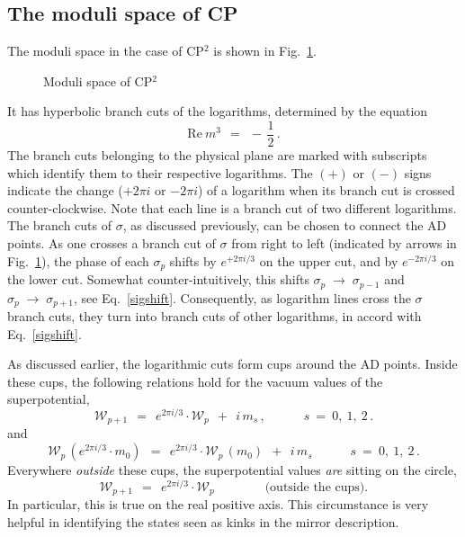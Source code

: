 \documentclass[epsfig,12pt]{article}
\def\beq{\begin{equation}}
\def\eeq{\end{equation}}
\def\beq{\begin{equation}}
\def\eeq{\end{equation}}
\newcommand{\W}{\mathcal{W}}
\begin{document}
\subsection[{The moduli space of CP$^2$}]
	{The moduli space of CP}

	The moduli space in the case of CP$^2$ is shown in Fig.~\ref{fcp2}. 
\begin{figure}
\begin{center}
\epsfxsize=7.5cm
\caption{Moduli space of CP$^2$}
\label{fcp2}
\end{center}
\end{figure}
	It has hyperbolic branch cuts of the logarithms, determined by the equation
\beq
	\text{Re}~m^3 ~~=~~ -\,\frac{1}{2}\,.
\eeq
	The branch cuts belonging to the physical plane are marked with subscripts which
	identify them to their respective logarithms.
	The $ {\scriptstyle (+)} $ or $ {\scriptstyle (-)} $ signs indicate 
	the change ($ + 2 \pi i $ or $ - 2 \pi i $) of a logarithm 
	when its branch cut is crossed counter-clockwise.
	Note that each line is a branch cut of two different logarithms. 
	The branch cuts of $ \sigma $, as discussed previously, can be chosen to connect the AD points.
	As one crosses a branch cut of $ \sigma $ from right to left (indicated by arrows in Fig.~\ref{fcp2}), 
	the phase of each $ \sigma_p $ shifts by $ e^{+ 2 \pi i / 3} $ on the upper cut, 
	and by $ e^{- 2 \pi i / 3} $ on the lower cut.
	Somewhat counter-intuitively, 
	this shifts $ \sigma_p \;\to\; \sigma_{p-1} $ and $ \sigma_p \;\to\; \sigma_{p+1} $,
	see Eq.~\eqref{sigshift}.
	Consequently, as logarithm lines cross the $ \sigma $ branch cuts, they turn into branch
	cuts of other logarithms, in accord with Eq.~\eqref{sigshift}.

	As discussed earlier, the logarithmic cuts form cups around the AD points. 
	Inside these cups, the following relations hold for the vacuum values of the superpotential,
\beq
	\W_{p+1} ~~=~~ e^{2 \pi i / 3} \cdot \W_p ~~+~~ i\, m_s\,, \qquad\quad s~=~0,~1,~2\,.
\eeq
	and
\beq
	\W_p\, (e^{2 \pi i / 3} \cdot m_0) ~~=~~ e^{2 \pi i / 3} \cdot \W_p\, (m_0) ~~+~~ i\, m_s
	\qquad\quad s~=~0,~1,~2\,.
\eeq
	Everywhere {\it outside} these cups, the superpotential values {\it are} sitting on the circle,
\beq
	\W_{p+1} ~~=~~ e^{2 \pi i / 3} \cdot \W_p
	\qquad\qquad \text{(outside the cups)}.
\eeq
	In particular, this is true on the real positive axis.
	This circumstance is very helpful in identifying the states seen as kinks in the mirror description.
\end{document}
